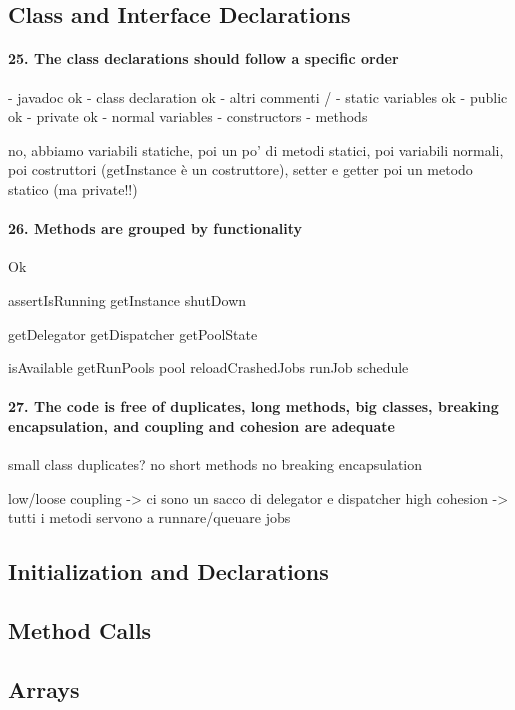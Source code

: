 \documentclass[english]{article}
\begin{document}
\subsection{Class and Interface Declarations}
\paragraph{25. The class declarations should follow a specific order}
- javadoc ok
- class declaration ok
- altri commenti /
- static variables ok
 - public ok
 - private ok
- normal variables 
- constructors
- methods

no, abbiamo variabili statiche, poi un po' di metodi statici, poi variabili normali, poi costruttori (getInstance è un costruttore), setter e getter poi un metodo statico (ma private!!)


\paragraph{26. Methods are grouped by functionality}
Ok

assertIsRunning
getInstance
shutDown

getDelegator
getDispatcher
getPoolState

isAvailable
getRunPools
pool
reloadCrashedJobs
runJob
schedule

\paragraph{27. The code is free of duplicates, long methods, big classes, breaking encapsulation, and coupling and cohesion are adequate}
small class
duplicates? no
short methods
no breaking encapsulation

low/loose coupling -> ci sono un sacco di delegator e dispatcher
high cohesion -> tutti i metodi servono a runnare/queuare jobs

\subsection{Initialization and Declarations}


\subsection{Method Calls}


\subsection{Arrays}
\end{document}
